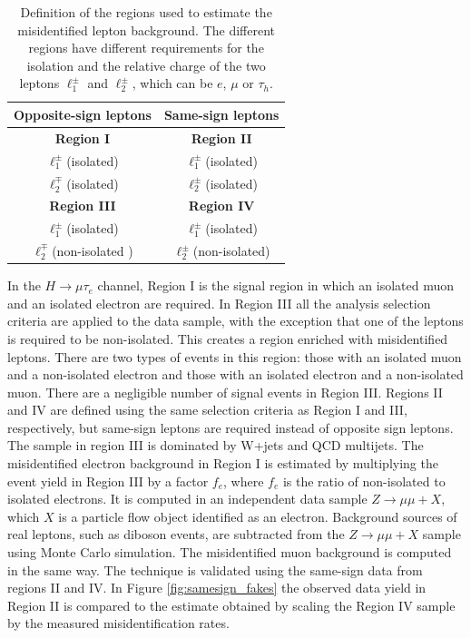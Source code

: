 \documentclass[oneside, letterpaper, oldfontcommands]{memoir}
\begin{document}
\begin{table}[hbt]
 \centering
 
 \renewcommand{\arraystretch}{1.1}
 \caption{Definition of the regions used to estimate the misidentified lepton background. The different regions have different requirements for the
isolation and the relative charge of the two leptons $\ell^{\pm}_{1}$ and $\ell^{\pm}_{2}$, which can be $e$, $\mu$ or $\tau_{h}$.}
  \label{tab:fakeratediagram}
  
  \begin{tabular}{c|c}  
  Opposite-sign leptons & Same-sign leptons \\
  \hline
\textbf{Region I}              &  \textbf{Region II}             \\ \hline
$\ell^{\pm}_{1}$(isolated)  &  $\ell^{\pm}_{1}$(isolated)             \\
$\ell^{\mp}_{2}$(isolated)  &  $\ell^{\pm}_{2}$(isolated)             \\

\hline \hline
\textbf{Region III}           &  \textbf{Region IV}             \\ \hline
$\ell^{\pm}_{1}$(isolated)  &  $\ell^{\pm}_{1}$(isolated)             \\
$\ell^{\mp}_{2}$(non-isolated )  &  $\ell^{\pm}_{2}$(non-isolated)             \\
\hline
  \end{tabular}
  
\end{table}


\qquad In the $H \rightarrow \mu\tau_{e}$ channel, Region I is the signal region in which an isolated muon and an isolated electron are required. In Region III all the analysis selection criteria are applied to the data sample, with the exception that one of the leptons is required to be non-isolated. This creates a region enriched with misidentified leptons. There are two types of events in this region: those with an isolated muon and a non-isolated electron and those with an isolated electron and a non-isolated muon. There are a negligible number of signal events in Region III. Regions II and IV are defined using the same selection criteria as Region I and III, respectively, but same-sign leptons are required instead of opposite sign leptons. The sample in region III is dominated by W+jets and QCD multijets. The misidentified electron background in Region I is estimated by multiplying the event yield in Region III by a factor $f_{e}$, where $f_{e}$ is the ratio of non-isolated to isolated electrons. It is computed in an independent data sample $Z \rightarrow \mu\mu + X$, which $X$ is a particle flow object identified as an electron. Background sources of real leptons, such as diboson events, are subtracted from the $Z \rightarrow \mu\mu +X$ sample using Monte Carlo simulation. The misidentified muon background is computed in the same way. The technique is validated using the same-sign data from regions II and IV. In Figure \ref{fig:samesign_fakes} the observed data yield in Region II is compared to the estimate obtained by scaling the Region IV sample by the measured misidentification rates.
\end{document}
